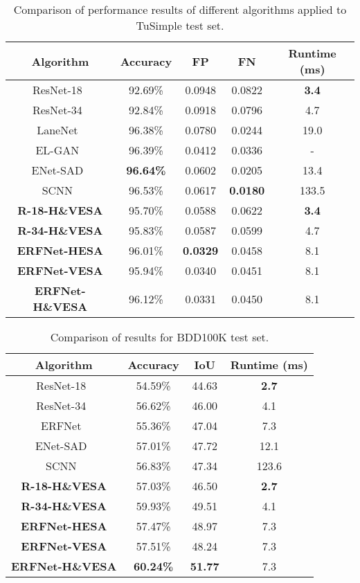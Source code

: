 \documentclass[10pt,twocolumn,letterpaper]{article}
\begin{document}
\begin{table}[!t]
	\centering
	\scriptsize{
		\begin{tabular}{c|c|c|c|c}
			\hline
			Algorithm & Accuracy & FP & FN & Runtime (ms)\\
			\hline \hline
			ResNet-18~\cite{he2016deep} & 92.69\% & 0.0948 & 0.0822 & \textbf{3.4} \\
			ResNet-34~\cite{he2016deep} & 92.84\% & 0.0918 & 0.0796 & 4.7 \\
			LaneNet~\cite{neven2018towards} & 96.38\% & 0.0780 & 0.0244 & 19.0 \\
			EL-GAN~\cite{ghafoorian2018gan} & 96.39\% & 0.0412 & 0.0336 & \-- \\
			ENet-SAD~\cite{hou2019learning} & \textbf{96.64\%} & 0.0602 & 0.0205 & 13.4 \\
			SCNN~\cite{pan2017spatial} & 96.53\% & 0.0617 & \textbf{0.0180} & 133.5 \\
			\hline \hline
			\textbf{R-18-H\&VESA} & 95.70\% & 0.0588 & 0.0622 & \textbf{3.4} \\
			\textbf{R-34-H\&VESA} & 95.83\% & 0.0587 & 0.0599 & 4.7 \\
			\textbf{ERFNet-HESA} & 96.01\% & \textbf{0.0329} & 0.0458 & 8.1 \\
			\textbf{ERFNet-VESA} & 95.94\% & 0.0340 & 0.0451 & 8.1 \\
			\textbf{ERFNet-H\&VESA} & 96.12\% & 0.0331 & 0.0450 & 8.1 \\
			\hline
\end{tabular}
	}
	\caption{Comparison of performance results of different algorithms applied to TuSimple test set.}
	\label{table:two}
\end{table}

\begin{table}[!t]
	\centering
	\footnotesize{
		\begin{tabular}{c|c|c|c}
			\hline
			Algorithm & Accuracy & IoU & Runtime (ms)\\
			\hline \hline
			ResNet-18~\cite{he2016deep} & 54.59\% & 44.63 & \textbf{2.7} \\
			ResNet-34~\cite{he2016deep} & 56.62\% & 46.00 & 4.1 \\
			ERFNet~\cite{romera2017erfnet} & 55.36\% & 47.04 & 7.3 \\
			ENet-SAD~\cite{hou2019learning} & 57.01\% & 47.72 & 12.1 \\
			SCNN~\cite{pan2017spatial} & 56.83\% & 47.34 & 123.6 \\
			\hline \hline
			\textbf{R-18-H\&VESA} & 57.03\% & 46.50 & \textbf{2.7} \\
			\textbf{R-34-H\&VESA} & 59.93\% & 49.51 & 4.1 \\
			\textbf{ERFNet-HESA} & 57.47\% & 48.97 & 7.3 \\
			\textbf{ERFNet-VESA} & 57.51\% & 48.24 & 7.3 \\
			\textbf{ERFNet-H\&VESA} & \textbf{60.24\%} & \textbf{51.77} & 7.3 \\
			\hline
		\end{tabular}
	}
	\caption{Comparison of results for BDD100K test set.}
	\label{table:three}
	\vspace{-2ex}
\end{table}
\end{document}
